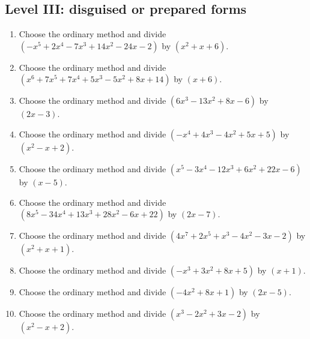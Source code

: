 \documentclass[11pt,oneside]{book}
\begin{document}
\subsection*{Level III: disguised or prepared forms}
\begin{enumerate}[leftmargin=*,label=\textbf{\arabic*.},itemsep=0.65\baselineskip]
\item Choose the ordinary method and divide $(- x^{5} + 2 x^{4} - 7 x^{3} + 14 x^{2} - 24 x - 2)$ by $(x^{2} + x + 6)$.
\item Choose the ordinary method and divide $(x^{6} + 7 x^{5} + 7 x^{4} + 5 x^{3} - 5 x^{2} + 8 x + 14)$ by $(x + 6)$.
\item Choose the ordinary method and divide $(6 x^{3} - 13 x^{2} + 8 x - 6)$ by $(2 x - 3)$.
\item Choose the ordinary method and divide $(- x^{4} + 4 x^{3} - 4 x^{2} + 5 x + 5)$ by $(x^{2} - x + 2)$.
\item Choose the ordinary method and divide $(x^{5} - 3 x^{4} - 12 x^{3} + 6 x^{2} + 22 x - 6)$ by $(x - 5)$.
\item Choose the ordinary method and divide $(8 x^{5} - 34 x^{4} + 13 x^{3} + 28 x^{2} - 6 x + 22)$ by $(2 x - 7)$.
\item Choose the ordinary method and divide $(4 x^{7} + 2 x^{5} + x^{3} - 4 x^{2} - 3 x - 2)$ by $(x^{2} + x + 1)$.
\item Choose the ordinary method and divide $(- x^{3} + 3 x^{2} + 8 x + 5)$ by $(x + 1)$.
\item Choose the ordinary method and divide $(- 4 x^{2} + 8 x + 1)$ by $(2 x - 5)$.
\item Choose the ordinary method and divide $(x^{3} - 2 x^{2} + 3 x - 2)$ by $(x^{2} - x + 2)$.
\end{enumerate}
\end{document}
